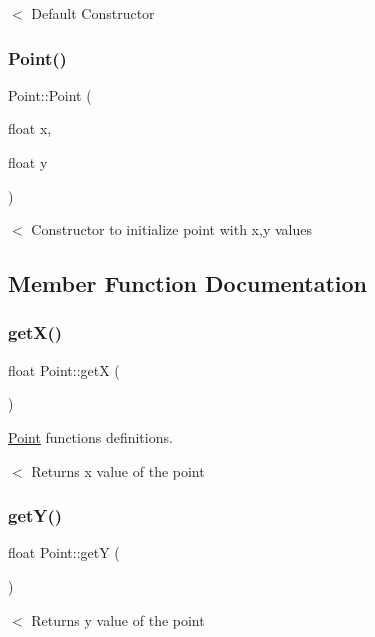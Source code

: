 $<$ Default Constructor \mbox{\label{classPoint_a30bc8409287de4f43e160664be834636}} 
\subsubsection{\texorpdfstring{Point()}{Point()}\hspace{0.1cm}{\footnotesize\ttfamily [2/2]}}
{\footnotesize\ttfamily Point\+::\+Point (\begin{DoxyParamCaption}\item[{float}]{x,  }\item[{float}]{y }\end{DoxyParamCaption})}

$<$ Constructor to initialize point with x,y values 

\subsection{Member Function Documentation}
\mbox{\label{classPoint_acc27466778cc87a662bba40268c4c0c8}} 
\subsubsection{\texorpdfstring{get\+X()}{getX()}}
{\footnotesize\ttfamily float Point\+::getX (\begin{DoxyParamCaption}{ }\end{DoxyParamCaption})}



\hyperlink{classPoint}{Point} functions definitions. 

$<$ Returns x value of the point \mbox{\label{classPoint_a3cccbca94719ddde353cce86ce0e2f64}} 
\subsubsection{\texorpdfstring{get\+Y()}{getY()}}
{\footnotesize\ttfamily float Point\+::getY (\begin{DoxyParamCaption}{ }\end{DoxyParamCaption})}

$<$ Returns y value of the point \mbox{\label{classPoint_ac24951f100ad7704f06f59b9cc1956ba}} 
